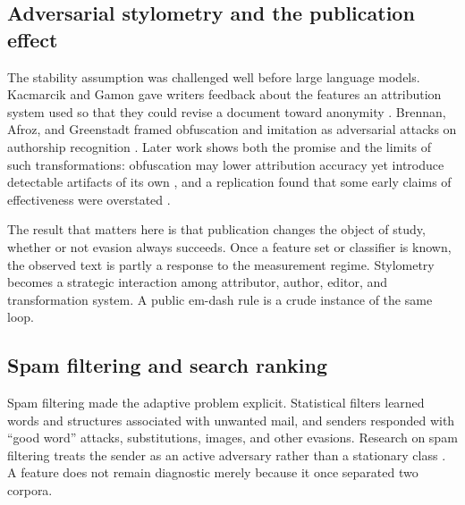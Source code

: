 \documentclass[11pt]{article}
\theoremstyle{plain}
\theoremstyle{definition}
\theoremstyle{remark}
\begin{document}
\subsection{Adversarial stylometry and the publication effect}

The stability assumption was challenged well before large language models. Kacmarcik and Gamon gave writers feedback about the features an attribution system used so that they could revise a document toward anonymity \cite{kacmarcik2006}. Brennan, Afroz, and Greenstadt framed obfuscation and imitation as adversarial attacks on authorship recognition \cite{brennan2012}. Later work shows both the promise and the limits of such transformations: obfuscation may lower attribution accuracy yet introduce detectable artifacts of its own \cite{mahmood2020}, and a replication found that some early claims of effectiveness were overstated \cite{wang2022}.

The result that matters here is that publication changes the object of study, whether or not evasion always succeeds. Once a feature set or classifier is known, the observed text is partly a response to the measurement regime. Stylometry becomes a strategic interaction among attributor, author, editor, and transformation system. A public em-dash rule is a crude instance of the same loop.

\subsection{Spam filtering and search ranking}

Spam filtering made the adaptive problem explicit. Statistical filters learned words and structures associated with unwanted mail, and senders responded with ``good word'' attacks, substitutions, images, and other evasions. Research on spam filtering treats the sender as an active adversary rather than a stationary class \cite{bratko2006,jorgensen2008}. A feature does not remain diagnostic merely because it once separated two corpora.
\end{document}
